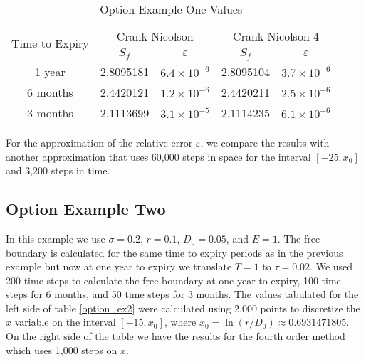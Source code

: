 \documentclass[00main.tex]{subfiles}
\begin{document}
\begin{table}
  \centering
  \small
    \begin{tabular}{c|cccc}
    \multirow{2}{*}{Time to Expiry} & \multicolumn{2}{c}{Crank-Nicolson} & \multicolumn{2}{c}{Crank-Nicolson 4} \\
	 & $S_f$ & $\varepsilon$ & $S_f$ & $\varepsilon$ \\ \hline
     1 year    & 2.8095181 & $6.4 \times 10^{-6}$ & 2.8095104 & $3.7 \times 10^{-6}$ \\
     6 months    & 2.4420121 & $1.2 \times 10^{-6}$ & 2.4420211 & $2.5\times 10^{-6}$ \\
     3 months    & 2.1113699 & $3.1 \times 10^{-5}$ & 2.1114235 & $6.1\times 10^{-6}$\\
    \end{tabular}%
    \caption{Option Example One Values}
  \label{option_ex1}%
\end{table}%


For the approximation of the relative error $\varepsilon$, we compare the results with another approximation that uses 60,000 steps in space for the interval $[-25,x_0]$ and 3,200 steps in time.


\subsection{Option Example Two}

In this example we use $\sigma=0.2$, $r=0.1$, $D_0=0.05$, and $E=1$. The free boundary is calculated for the same time to expiry periods as in the previous example but now at one year to expiry we translate $T=1$ to $\tau=0.02$. We used 200 time steps to calculate the free boundary at one year to expiry, 100 time steps for 6 months, and 50 time steps for 3 months. The values tabulated for the left side of table \ref{option_ex2} were calculated using 2,000 points to discretize the $x$ variable on the interval $[-15,x_0]$, where $x_0=\ln(r/D_0)\approx 0.6931471805$. On the right side of the table we have the results for the fourth order method which uses 1,000 steps on $x$.
\end{document}
